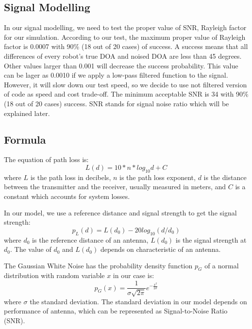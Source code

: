 \subsection{Signal Modelling}
In our signal modelling, we need to test the proper value of SNR, Rayleigh factor for our simulation. According to our test, the maximum proper value of Rayleigh factor is 0.0007 with 90\% (18 out of 20 cases) of success. A success means that all differences of every robot's true DOA and noised DOA are less than 45 degrees. Other values larger than 0.001 will decrease the success probability. This value can be lager as 0.0010 if we apply a low-pass filtered function to the signal. However, it will slow down our test speed, so we decide to use not filtered version of code as speed and cost trade-off. The minimum acceptable SNR is 34 with 90\%(18 out of 20 cases) success. SNR stands for signal noise ratio which will be explained later.
\\

\subsection{Formula}
The equation of path loss is:
\begin{equation}
L(d)=10*n*log_{10}d + C
\end{equation}
where $L$ is the path loss in decibels, $n$ is the path loss exponent, $d$ is the distance between the transmitter and the receiver, usually measured in meters, and $C$ is a constant which accounts for system losses.
\par
In our model, we use a reference distance and signal strength to get the signal strength:
\begin{equation}
p_{L}(d)=L(d_{0})-20log_{10}(d/d_{0})
\end{equation}
where $d_{0}$ is the reference distance of an antenna, $L(d_{0})$ is the signal strength at $d_{0}$. The value of $d_{0}$ and $L(d_{0})$ depends on characteristic of an antenna.
\\
\vspace{1cm}

The Gaussian White Noise has the probability density function $p_{G}$ of a normal distribution with random variable $x$ in our case is:
\begin{equation}
p_{G}(x)={\frac {1}{ {\sigma\sqrt {2\pi }}}}e^{-{\frac {x^{2}}{2\sigma}}}
\end{equation}
where $\sigma$  the standard deviation. The standard deviation in our model depends on performance of antenna, which can be represented as Signal-to-Noise Ratio (SNR).
\vspace{1cm}

